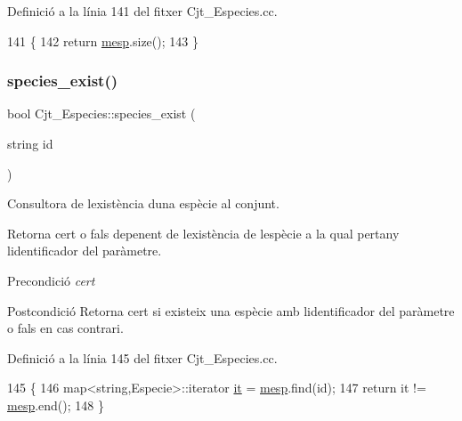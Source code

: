 Definició a la línia 141 del fitxer Cjt\+\_\+\+Especies.\+cc.


\begin{DoxyCode}
141                                         \{
142     \textcolor{keywordflow}{return} \hyperlink{class_cjt___especies_a64a525b38c78935e7432b362ea9a2306}{mesp}.size();
143 \}
\end{DoxyCode}
\mbox{\label{class_cjt___especies_a2ce9d7a4968d46686109477f448857ea}} 
\subsubsection{\texorpdfstring{species\+\_\+exist()}{species\_exist()}}
{\footnotesize\ttfamily bool Cjt\+\_\+\+Especies\+::species\+\_\+exist (\begin{DoxyParamCaption}\item[{string}]{id }\end{DoxyParamCaption})}



Consultora de l\textquotesingle{}existència d\textquotesingle{}una espècie al conjunt. 

Retorna cert o fals depenent de l\textquotesingle{}existència de l\textquotesingle{}espècie a la qual pertany l\textquotesingle{}identificador del paràmetre.

\begin{DoxyPrecond}{Precondició}
{\itshape cert} 
\end{DoxyPrecond}
\begin{DoxyPostcond}{Postcondició}
Retorna cert si existeix una espècie amb l\textquotesingle{}identificador del paràmetre o fals en cas contrari. 
\end{DoxyPostcond}


Definició a la línia 145 del fitxer Cjt\+\_\+\+Especies.\+cc.


\begin{DoxyCode}
145                                           \{
146     map<string,Especie>::iterator \hyperlink{class_cjt___especies_a25b19415a21bdabe9e2fc2ad7d2f68a5}{it} = \hyperlink{class_cjt___especies_a64a525b38c78935e7432b362ea9a2306}{mesp}.find(\textcolor{keywordtype}{id});
147     \textcolor{keywordflow}{return} it != \hyperlink{class_cjt___especies_a64a525b38c78935e7432b362ea9a2306}{mesp}.end();
148 \}
\end{DoxyCode}
\mbox{\label{class_cjt___especies_a1e01bf8dfbde0983404efba05bd1b4b3}} 
